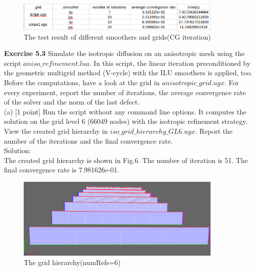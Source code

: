 \documentclass[a4paper]{article}
\begin{document}
\begin{figure}[htbp]
	\centering
	\begin{minipage}[t]{0.7\textwidth}
		\centering		\includegraphics[width=10cm]{5.2b.png}
		\caption{The test result of different smoothers and grids(CG iteration)}
	\end{minipage}
\end{figure}

\noindent \textbf{Exercise 5.3} Simulate the isotropic diffusion on an anisotropic mesh using the script $aniso\_refinement.lua$. In this script, the linear iteration preconditioned by the geometric multigrid method (V-cycle) with the ILU smoothers is applied, too. Before the computations, have a look at the grid in $anisotropic\_grid.ugx$. For every experiment, report the number of iterations, the average convergence rate of the solver and the norm of the last defect.\\

\noindent (a) [1 point] Run the script without any command line options. It computes the solution on the grid level 6 (66049 nodes) with the isotropic refinement strategy. View the created grid hierarchy in $iso\_grid\_hierarchy\_GL6.ugx$. Report the number of the iterations and the final convergence rate.\\

\noindent Solution:\\

\noindent The created grid hierarchy is shown in Fig.6. The number of iteration is 51. The final convergence rate is 7.981626e-01.\\

\begin{figure}[htbp]
	\centering
	\begin{minipage}[t]{0.7\textwidth}
		\centering		\includegraphics[width=10cm]{grids.png}
		\caption{The grid hierarchy(numRefs=6)}
	\end{minipage}
\end{figure}
\end{document}
